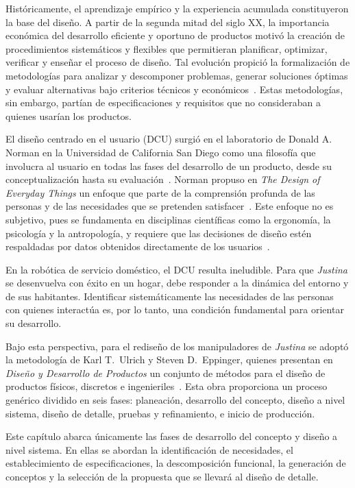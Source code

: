 Históricamente, el aprendizaje empírico y la experiencia acumulada constituyeron la base del diseño. A partir de la segunda mitad del siglo XX, la importancia económica del desarrollo eficiente y oportuno de productos motivó la creación de procedimientos sistemáticos y flexibles que permitieran planificar, optimizar, verificar y enseñar el proceso de diseño. Tal evolución propició la formalización de metodologías para analizar y descomponer problemas, generar soluciones óptimas y evaluar alternativas bajo criterios técnicos y económicos~\cite{Pahl-Beitz}. Estas metodologías, sin embargo, partían de especificaciones y requisitos que no consideraban a quienes usarían los productos.

El diseño centrado en el usuario (DCU) surgió en el laboratorio de Donald A. Norman en la Universidad de California San Diego como una filosofía que involucra al usuario en todas las fases del desarrollo de un producto, desde su conceptualización hasta su evaluación~\cite{Garreta-Mor}. Norman propuso en \textit{The Design of Everyday Things} un enfoque que parte de la comprensión profunda de las personas y de las necesidades que se pretenden satisfacer~\cite{Norman}. Este enfoque no es subjetivo, pues se fundamenta en disciplinas científicas como la ergonomía, la psicología y la antropología, y requiere que las decisiones de diseño estén respaldadas por datos obtenidos directamente de los usuarios~\cite{Lowdermilk}.

En la robótica de servicio doméstico, el DCU resulta ineludible. Para que \emph{Justina} se desenvuelva con éxito en un hogar, debe responder a la dinámica del entorno y de sus habitantes. Identificar sistemáticamente las necesidades de las personas con quienes interactúa es, por lo tanto, una condición fundamental para orientar su desarrollo.

Bajo esta perspectiva, para el rediseño de los manipuladores de \emph{Justina} se adoptó la metodología de Karl T.\ Ulrich y Steven D.\ Eppinger, quienes presentan en \textit{Diseño y Desarrollo de Productos} un conjunto de métodos para el diseño de productos físicos, discretos e ingenieriles~\cite{Ulrich-Eppinger}. Esta obra proporciona un proceso genérico dividido en seis fases: planeación, desarrollo del concepto, diseño a nivel sistema, diseño de detalle, pruebas y refinamiento, e inicio de producción.

Este capítulo abarca únicamente las fases de desarrollo del concepto y diseño a nivel sistema. En ellas se abordan la identificación de necesidades, el establecimiento de especificaciones, la descomposición funcional, la generación de conceptos y la selección de la propuesta que se llevará al diseño de detalle.

